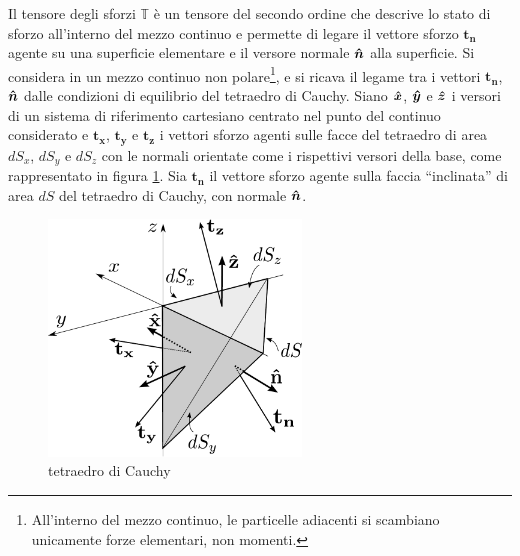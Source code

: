 

Il tensore degli sforzi $\mathbb{T}$ è un tensore del secondo ordine che descrive lo stato di sforzo all'interno del mezzo continuo e permette di legare il vettore sforzo $\bm{t_n}$ agente su una superficie elementare e il versore normale $\bm{\hat{n}}$ alla superficie.
Si considera in un mezzo continuo non polare\footnote{
 All'interno del mezzo continuo, le particelle adiacenti si scambiano unicamente forze elementari, non momenti.
}, e si ricava il legame tra i vettori $\bm{t_n}$, $\bm{\hat{n}}$ dalle condizioni di equilibrio del tetraedro di Cauchy. Siano $\bm{\hat{x}}$, $\bm{\hat{y}}$ e $\bm{\hat{z}}$ i versori di un sistema di riferimento cartesiano centrato nel punto del continuo considerato e $\bm{t_x}$, $\bm{t_y}$ e $\bm{t_z}$ i vettori sforzo agenti sulle facce del tetraedro di area $dS_x$, $dS_y$ e $dS_z$ con le normali orientate come i rispettivi versori della base, come rappresentato in figura \ref{fig:tetraedroCauchy}. Sia $\bm{t_n}$ il vettore sforzo agente sulla faccia ``inclinata'' di area $dS$ del tetraedro di Cauchy, con normale $\bm{\hat{n}}$.

\begin{figure}[h!]
\centering
 \includegraphics[width=0.60\textwidth]{./fig/cauchy}
\caption{tetraedro di Cauchy}\label{fig:tetraedroCauchy}
\end{figure}

